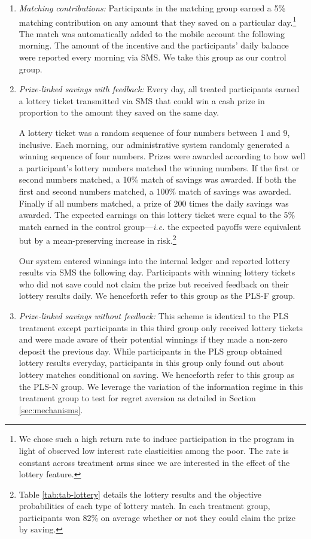 \documentclass[11pt]{article}
\begin{document}
		\begin{enumerate} \setlength{\itemsep}{1pt}

			\item \textit{Matching contributions:} Participants in the matching group earned a 5\% matching contribution on any amount that they saved on a particular day.\footnote{We chose such a high return rate to induce participation in the program in light of observed low interest rate elasticities among the poor. The rate is constant across treatment arms since we are interested in the effect of the lottery feature.} The match was automatically added to the mobile account the following morning. The amount of the incentive and the participants' daily balance were reported every morning via SMS. We take this group as our control group.

			\item \textit{Prize-linked savings with feedback:} Every day, all treated participants earned a lottery ticket transmitted via SMS that could win a cash prize in proportion to the amount they saved on the same day.

			A lottery ticket was a random sequence of four numbers between 1 and 9, inclusive. Each morning, our administrative system randomly generated a winning sequence of four numbers. Prizes were awarded according to how well a participant's lottery numbers matched the winning numbers. If the first or second numbers matched, a 10\% match of savings was awarded. If both the first and second numbers matched, a 100\% match of savings was awarded. Finally if all numbers matched, a prize of 200 times the daily savings was awarded. The expected earnings on this lottery ticket were equal to the 5\% match earned in the control group---\textit{i.e.} the expected payoffs were equivalent but by a mean-preserving increase in risk.\footnote{Table \ref{tab:tab-lottery} details the lottery results and the objective probabilities of each type of lottery match. In each treatment group, participants won 82\% on average whether or not they could claim the prize by saving.}

			Our system entered winnings into the internal ledger and reported lottery results via SMS the following day. Participants with winning lottery tickets who did not save could not claim the prize but received feedback on their lottery results daily. We henceforth refer to this group as the PLS-F group. 

			\item \textit{Prize-linked savings without feedback:} This scheme is identical to the PLS treatment except participants in this third group only received lottery tickets and were made aware of their potential winnings if they made a non-zero deposit the previous day. While participants in the PLS group obtained lottery results everyday, participants in this group only found out about lottery matches conditional on saving. We henceforth refer to this group as the PLS-N group. We leverage the variation of the information regime in this treatment group to test for regret aversion as detailed in Section \ref{sec:mechanisms}.

		\end{enumerate}
\end{document}
